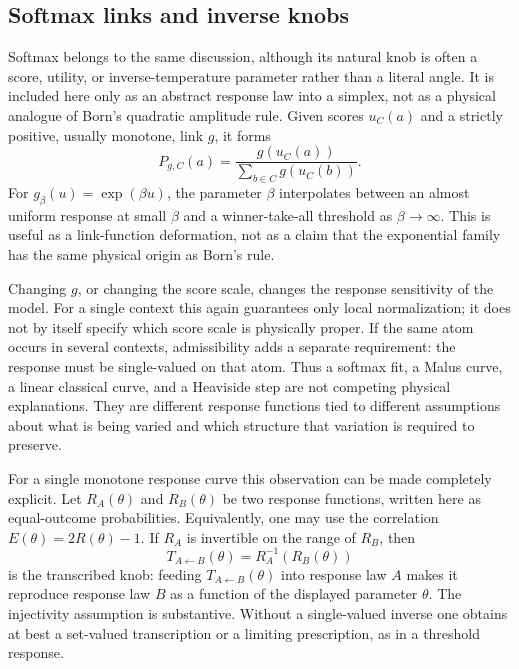 \documentclass[aps,pra,reprint,superscriptaddress,nofootinbib,floatfix]{revtex4-2}
\begin{document}
\subsection{Softmax links and inverse knobs}

Softmax belongs to the same discussion, although its natural knob is often a
score, utility, or inverse-temperature parameter rather than a literal angle.
It is included here only as an abstract response law into a simplex, not as a
physical analogue of Born's quadratic amplitude rule.  Given scores
\(u_C(a)\) and a strictly positive, usually monotone, link \(g\), it forms
\begin{equation}
        P_{g,C}(a)
        =
        \frac{g(u_C(a))}
        {\sum_{b\in C}g(u_C(b))}.
        \label{eq:local-softmax}
\end{equation}
For \(g_\beta(u)=\exp(\beta u)\), the parameter \(\beta\) interpolates between
an almost uniform response at small \(\beta\) and a winner-take-all threshold
as \(\beta\to\infty\).  This is useful as a link-function deformation, not as
a claim that the exponential family has the same physical origin as Born's
rule.

Changing \(g\), or changing the score scale, changes the response sensitivity
of the model.  For a single context this again guarantees only local
normalization; it does not by itself specify which score scale is physically
proper.  If the same atom occurs in several contexts, admissibility adds a
separate requirement: the response must be single-valued on that atom.  Thus
a softmax fit, a Malus curve, a linear classical curve, and a Heaviside step
are not competing physical explanations.  They are different response
functions tied to different assumptions about what is being varied and which
structure that variation is required to preserve.

For a single monotone response curve this observation can be made completely
explicit.  Let \(R_A(\theta)\) and \(R_B(\theta)\) be two response functions,
written here as equal-outcome probabilities.  Equivalently, one may use the
correlation \(E(\theta)=2R(\theta)-1\).  If \(R_A\) is invertible on the range
of \(R_B\), then
\begin{equation}
        T_{A\leftarrow B}(\theta)
        =
        R_A^{-1}(R_B(\theta))
        \label{eq:inverse-knob}
\end{equation}
is the transcribed knob: feeding \(T_{A\leftarrow B}(\theta)\) into response
law \(A\) makes it reproduce response law \(B\) as a function of the
displayed parameter \(\theta\).  The injectivity assumption is substantive.
Without a single-valued inverse one obtains at best a set-valued
transcription or a limiting prescription, as in a threshold response.
\end{document}
